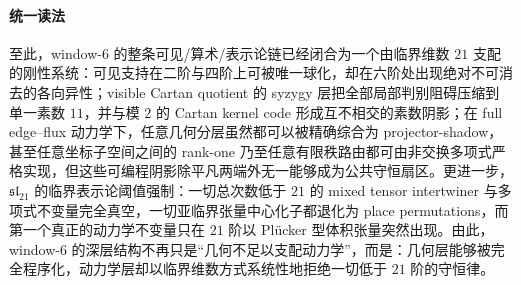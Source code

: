 \paragraph{统一读法}
至此，window-\(6\) 的整条可见/算术/表示论链已经闭合为一个由临界维数 \(21\) 支配的刚性系统：可见支持在二阶与四阶上可被唯一球化，却在六阶处出现绝对不可消去的各向异性；visible Cartan quotient 的 syzygy 层把全部局部判别阻碍压缩到单一素数 \(11\)，并与模 \(2\) 的 Cartan kernel code 形成互不相交的素数阴影；在 full edge--flux 动力学下，任意几何分层虽然都可以被精确综合为 projector-shadow，甚至任意坐标子空间之间的 rank-one 乃至任意有限秩路由都可由非交换多项式严格实现，但这些可编程阴影除平凡两端外无一能够成为公共守恒扇区。更进一步，\(\mathfrak{sl}_{21}\) 的临界表示论阈值强制：一切总次数低于 \(21\) 的 mixed tensor intertwiner 与多项式不变量完全真空，一切亚临界张量中心化子都退化为 place permutations，而第一个真正的动力学不变量只在 \(21\) 阶以 Pl\"ucker 型体积张量突然出现。由此，window-\(6\) 的深层结构不再只是“几何不足以支配动力学”，而是：几何层能够被完全程序化，动力学层却以临界维数方式系统性地拒绝一切低于 \(21\) 阶的守恒律。

\endinput
